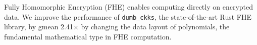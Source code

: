 Fully Homomorphic Encryption (FHE) enables computing directly on encrypted
data.
We improve the performance of \verb!dumb_ckks!, the state-of-the-art Rust FHE
library, by gmean 2.41$\times$ by changing the data layout of polynomials, the
fundamental mathematical type in FHE computation.
